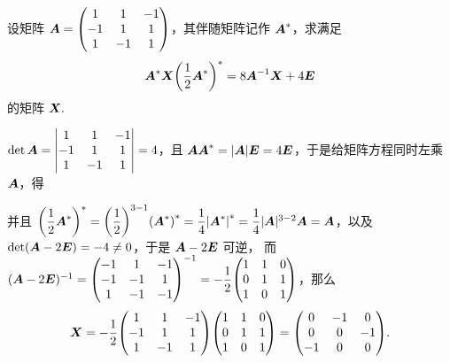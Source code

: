 \begin{example}
    设矩阵 $\vb*{A}=\mqty(1&1&-1\\-1&1&1\\1&-1&1)$，其伴随矩阵记作 $\vb*{A}^*$，求满足
    $$\vb*{A}^*\vb*{X}\qty(\dfrac{1}{2}\vb*{A}^*)^*=8\vb*{A}^{-1}\vb*{X}+4\vb*{E}$$ 的矩阵 $\vb*{X}.$
\end{example}
\begin{solution}
    $\det \vb*{A}=\mqty|1&1&-1\\-1&1&1\\1&-1&1|=4$，且 $\vb*{A}\vb*{A}^*=|\vb*{A}|\vb*{E}=4\vb*{E}$，于是给矩阵方程同时左乘 $\vb*{A}$，得
    并且 $\qty(\dfrac{1}{2}\vb*{A}^*)^*=\qty(\dfrac{1}{2})^{3-1}\qty(\vb*{A}^*)^*=\dfrac{1}{4}\qty|\vb*{A}^*|^*=\dfrac{1}{4}|\vb*{A}|^{3-2}\vb*{A}=\vb*{A}$，以及 $\det(\vb*{A}-2\vb*{E})= -4\neq0$，于是 $\vb*{A}-2\vb*{E}$ 可逆，
    而 $(\vb*{A}-2\vb*{E})^{-1}=\mqty(-1&1&-1\\-1&-1&1\\1&-1&-1)^{-1}=-\dfrac{1}{2}\mqty(1&1&0\\0&1&1\\1&0&1)$，那么
    $$\vb*{X}=-\dfrac{1}{2}\mqty(1&1&-1\\-1&1&1\\1&-1&1)\mqty(1&1&0\\0&1&1\\1&0&1)=\mqty(0&-1&0\\0&0&-1\\-1&0&0).$$
\end{solution}

